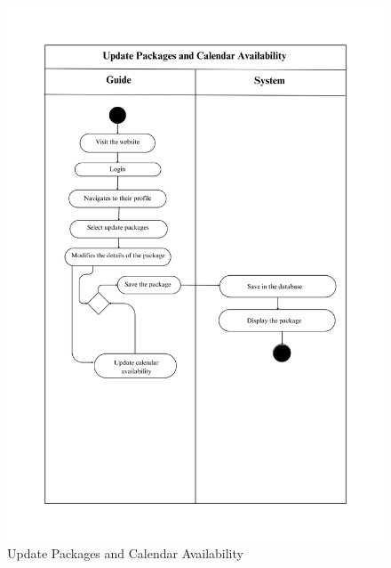 \begin{figure}[h!]
    \centering
    \includegraphics[width=1\textwidth]{Images/Activity Diagrams/15 Update Packages and Calendar Visibility.png}
    \caption{Update Packages and Calendar Availability}
    \label{fig:activity-update-packages}
\end{figure}

